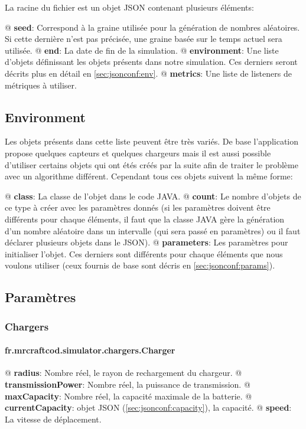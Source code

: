 \documentclass[final]{polytech/polytech}
\begin{document}
		La racine du fichier est un objet JSON contenant plusieurs éléments:
		\begin{easylist}[itemize]
			@ \textbf{seed}: Correspond à la graine utilisée pour la génération de nombres aléatoires. Si cette dernière n'est pas précisée, une graine basée sur le temps actuel sera utilisée.
			@ \textbf{end}: La date de fin de la simulation. 
			@ \textbf{environment}: Une liste d'objets définissant les objets présents dans notre simulation. Ces derniers seront décrits plus en détail en \autoref{sec:jsonconf:env}.
			@ \textbf{metrics}: Une liste de listeners de métriques à utiliser.	
		\end{easylist}
		
		\subsection{Environment\label{sec:jsonconf:env}}
			Les objets présents dans cette liste peuvent être très variés.
			De base l'application propose quelques capteurs et quelques chargeurs mais il est aussi possible d'utiliser certains objets qui ont étés créés par la suite afin de traiter le problème avec un algorithme différent.
			Cependant tous ces objets suivent la même forme:
			\begin{easylist}[itemize]
				@ \textbf{class}: La classe de l'objet dans le code JAVA.
				@ \textbf{count}: Le nombre d'objets de ce type à créer avec les paramètres donnés (si les paramètres doivent être différents pour chaque éléments, il faut que la classe JAVA gère la génération d'un nombre aléatoire dans un intervalle (qui sera passé en paramètres) ou il faut déclarer plusieurs objets dans le JSON).	
				@ \textbf{parameters}: Les paramètres pour initialiser l'objet. Ces derniers sont différents pour chaque éléments que nous voulons utiliser (ceux fournis de base sont décris en \autoref{sec:jsonconf:params}).
			\end{easylist}

		\subsection{Paramètres\label{sec:jsonconf:params}}
			\subsubsection{Chargers}
				\paragraph{fr.mrcraftcod.simulator.chargers.Charger}
					\begin{easylist}[itemize]
						@ \textbf{radius}: Nombre réel, le rayon de rechargement du chargeur.
						@ \textbf{transmissionPower}: Nombre réel, la puissance de transmission.
						@ \textbf{maxCapacity}: Nombre réel, la capacité maximale de la batterie.
						@ \textbf{currentCapacity}: objet JSON (\autoref{sec:jsonconf:capacity}), la capacité.
						@ \textbf{speed}: La vitesse de déplacement.
					\end{easylist}
			
\end{document}
